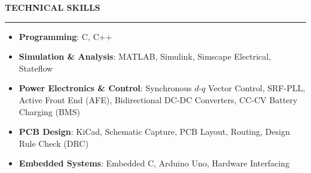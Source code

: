 \documentclass[a4paper,10pt]{article}
\begin{document}
\vspace{6pt}

{\large \textbf{TECHNICAL SKILLS}}
\vspace{-4pt}
\hrule
\vspace{4pt}

\begin{itemize}[leftmargin=12pt, itemsep=2pt, topsep=2pt, label=\textbullet]
    \item \textbf{Programming}: C, C++
    \item \textbf{Simulation \& Analysis}: MATLAB, Simulink, Simscape Electrical, Stateflow
    \item \textbf{Power Electronics \& Control}: Synchronous $d$-$q$ Vector Control, SRF-PLL, Active Front End (AFE), Bidirectional DC-DC Converters, CC-CV Battery Charging (BMS)
    \item \textbf{PCB Design}: KiCad, Schematic Capture, PCB Layout, Routing, Design Rule Check (DRC)
    \item \textbf{Embedded Systems}: Embedded C, Arduino Uno, Hardware Interfacing
\end{itemize}
\end{document}
